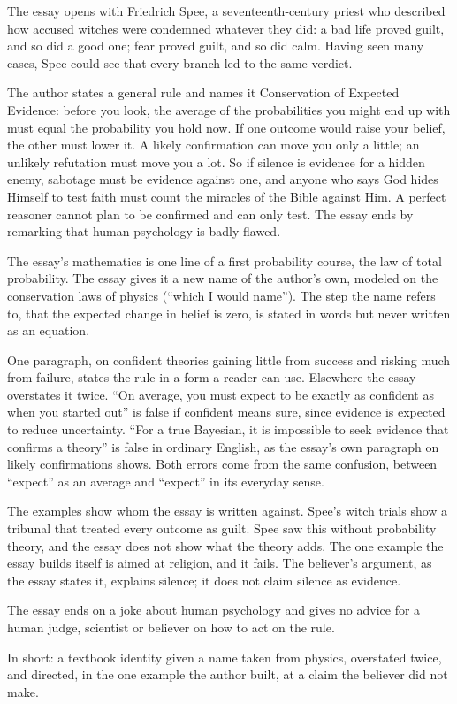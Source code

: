 \begin{afterword}
\summaryhead

The essay opens with Friedrich Spee, a seventeenth-century priest who described how accused witches were condemned whatever they did: a bad life proved guilt, and so did a good one; fear proved guilt, and so did calm. Having seen many cases, Spee could see that every branch led to the same verdict.

The author states a general rule and names it Conservation of Expected Evidence: before you look, the average of the probabilities you might end up with must equal the probability you hold now. If one outcome would raise your belief, the other must lower it. A likely confirmation can move you only a little; an unlikely refutation must move you a lot. So if silence is evidence for a hidden enemy, sabotage must be evidence against one, and anyone who says God hides Himself to test faith must count the miracles of the Bible against Him. A perfect reasoner cannot plan to be confirmed and can only test. The essay ends by remarking that human psychology is badly flawed.

\responsehead

The essay's mathematics is one line of a first probability course, the law of total probability. The essay gives it a new name of the author's own, modeled on the conservation laws of physics (``which I would name''). The step the name refers to, that the expected change in belief is zero, is stated in words but never written as an equation.

One paragraph, on confident theories gaining little from success and risking much from failure, states the rule in a form a reader can use. Elsewhere the essay overstates it twice. ``On average, you must expect to be exactly as confident as when you started out'' is false if confident means sure, since evidence is expected to reduce uncertainty. ``For a true Bayesian, it is impossible to seek evidence that confirms a theory'' is false in ordinary English, as the essay's own paragraph on likely confirmations shows. Both errors come from the same confusion, between ``expect'' as an average and ``expect'' in its everyday sense.

The examples show whom the essay is written against. Spee's witch trials show a tribunal that treated every outcome as guilt. Spee saw this without probability theory, and the essay does not show what the theory adds. The one example the essay builds itself is aimed at religion, and it fails. The believer's argument, as the essay states it, explains silence; it does not claim silence as evidence.

The essay ends on a joke about human psychology and gives no advice for a human judge, scientist or believer on how to act on the rule.

In short: a textbook identity given a name taken from physics, overstated twice, and directed, in the one example the author built, at a claim the believer did not make.
\end{afterword}

